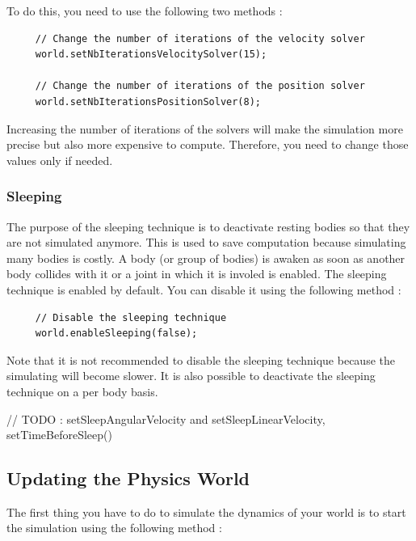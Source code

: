 \documentclass[a4paper,12pt]{article}
\begin{document}
    To do this, you need to use the following two methods : \\

    \begin{lstlisting}
     // Change the number of iterations of the velocity solver
     world.setNbIterationsVelocitySolver(15);

     // Change the number of iterations of the position solver
     world.setNbIterationsPositionSolver(8);
  \end{lstlisting}

    \vspace{0.6cm}

    Increasing the number of iterations of the solvers will make the simulation more precise but also more expensive to compute. Therefore, you need to change
    those values only if needed.

    \subsubsection{Sleeping}

    The purpose of the sleeping technique is to deactivate resting bodies so that they are not simulated anymore. This is used to save computation because simulating many bodies is costly.
    A body (or group of bodies) is awaken as soon as another body collides with it or a joint in which it is involed is enabled. The sleeping technique is enabled by default. You can disable it
    using the following method : \\

    \begin{lstlisting}
     // Disable the sleeping technique
     world.enableSleeping(false);
  \end{lstlisting}

    \vspace{0.6cm}

    Note that it is not recommended to disable the sleeping technique because the simulating will become slower. It is also possible to deactivate the sleeping technique on a
    per body basis.

    // TODO : setSleepAngularVelocity and setSleepLinearVelocity, setTimeBeforeSleep()
    
    \subsection{Updating the Physics World}

    The first thing you have to do to simulate the dynamics of your world is to start the simulation using the following method : \\
\end{document}

